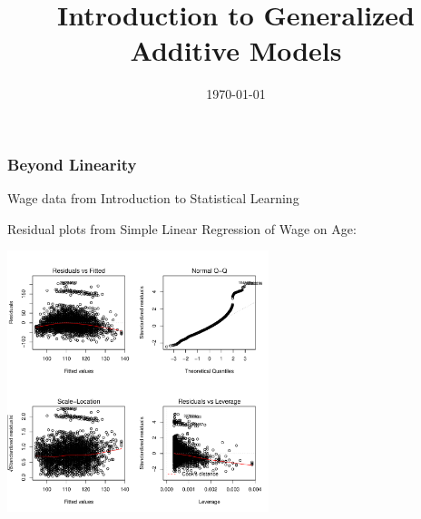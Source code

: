 \documentclass[]{beamer}
\title{Introduction to Generalized Additive Models}
\date{\today}
\begin{document}
\maketitle
\begin{frame}[fragile]\frametitle{Beyond Linearity}
Wage data from Introduction to Statistical Learning

Residual plots from Simple Linear Regression of Wage on Age:
\centerline{\includegraphics[height=3in]{resid-slr}}
\end{frame}
\end{document}
